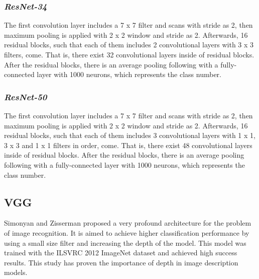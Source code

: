 \subsubsection*{\textit{ResNet-34}}

The first convolution layer includes a 7 x 7 filter and scans with stride as 2, then maximum pooling is applied with 2 x 2 window and stride as 2. Afterwards, 16 residual blocks, such that each of them includes 2 convolutional layers with 3 x 3 filters, come. That is, there exist 32 convolutional layers inside of residual blocks. After the residual blocks, there is an average pooling following with a fully-connected layer with 1000 neurons, which represents the class number.

\subsubsection*{\textit{ResNet-50}}

The first convolution layer includes a 7 x 7 filter and scans with stride as 2, then maximum pooling is applied with 2 x 2 window and stride as 2. Afterwards, 16 residual blocks, such that each of them includes 3 convolutional layers with 1 x 1, 3 x 3 and 1 x 1 filters in order, come. That is, there exist 48 convolutional layers inside of residual blocks. After the residual blocks, there is an average pooling following with a fully-connected layer with 1000 neurons, which represents the class number.

\subsection{VGG}

Simonyan and Zisserman \cite{VGG} proposed a very profound architecture for the problem of image recognition. It is aimed to achieve higher classification performance by using a small size filter and increasing the depth of the model. This model was trained with the ILSVRC 2012  ImageNet \cite{imagenet} dataset and achieved high success results. This study has proven the importance of depth in image description models.

